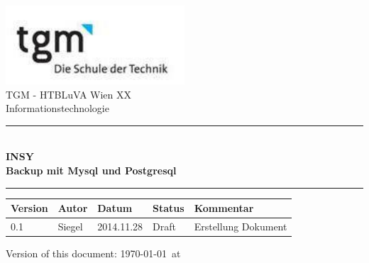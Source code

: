 \documentclass[10pt]{article}
\begin{document}
\begin{titlepage}
\begin{center}

\includegraphics[width=0.5\textwidth]{pictures/logo}\\  

\LARGE TGM - HTBLuVA Wien XX \\ Informationstechnologie  \\[1.5cm]

\rule{14cm}{1mm}
{ \huge \bfseries \\[0.4cm]  \huge INSY \\ \LARGE Backup mit Mysql und Postgresql \\[0.4cm] }

\rule{14cm}{1mm}



\noindent 
\vspace{7cm}
\small
\begin{center}
  \begin{tabular}{ | p{} | p{} | p{} | p{} | p{} |}
    \hline
\textbf{Version} & \textbf{Autor} & \textbf{Datum} & \textbf{Status} & \textbf{Kommentar} \\ 
    \hline 
    \hline
0.1 & Siegel & 2014.11.28 & Draft &  Erstellung Dokument   \\ 
    \hline
  \end{tabular}
\end{center}

\vfill

{\small Version of this document: \today ~at  \thistime    }
\end{center}

\end{titlepage}


\ohead{\headmark}
\ofoot{\pagemark}
\tableofcontents
\end{document}
